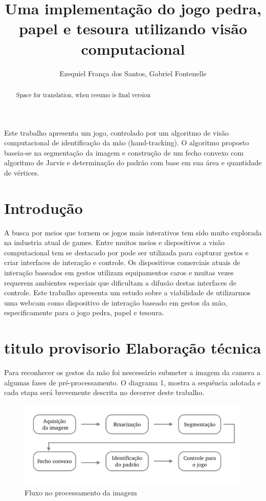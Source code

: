 \documentclass[12pt]{article}
\title{Uma implementação do jogo pedra, papel e tesoura utilizando visão computacional}
\author{Ezequiel França dos Santos\inst{1}, Gabriel Fontenelle\inst{1}}
\begin{document}
 
\maketitle

\begin{abstract}
Space for translation, when resumo is final version %
\end{abstract}
     
\begin{resumo} 
Este trabalho apresenta um jogo, controlado por um algoritmo de visão computacional de identificação da mão (hand-tracking). O algoritmo proposto baseia-se na segmentação da imagem e construção de um fecho convexo com algoritmo de Jarvis e determinação do padrão com base em sua área e quantidade de vértices.
\end{resumo}


\section{Introdução}

A busca por meios que tornem os jogos mais interativos tem sido muito explorada na industria atual de games. Entre muitos meios e dispositivos a visão computacional tem se destacado por pode ser utilizada para capturar gestos e criar interfaces de interação e controle. Os dispositivos comerciais atuais de interação baseados em gestos utilizam equipamentos caros e
muitas vezes requerem ambientes especiais que dificultam a difusão destas interfaces de controle.
Este trabalho apresenta um estudo sobre a viabilidade de utilizarmos uma webcam como dispositivo de interação baseado em gestos da mão, especificamente para o jogo pedra, papel e tesoura.


\section{titulo provisorio Elaboração técnica}

Para reconhecer os gestos da mão foi nescessário submeter a imagem da camera a algumas fases de pré-processamento. O diagrama 1, mostra a sequência adotada e cada etapa será brevemente descrita no decorrer deste trabalho.  


\begin{figure}[ht]
\centering
\includegraphics[width=.7\textwidth]{fluxo.png}
\caption{Fluxo no processamento da imagem} \label{fig1}
\end{figure}
\end{document}
